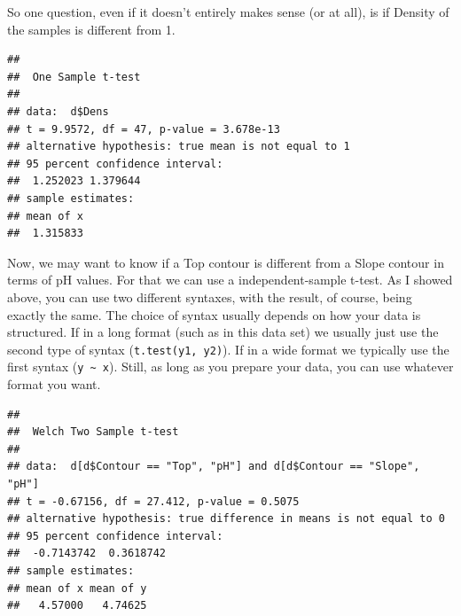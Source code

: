 \documentclass[
]{book}
\newenvironment{Shaded}{\begin{snugshade}}{\end{snugshade}}
\newcommand{\AttributeTok}[1]{\textcolor[rgb]{0.77,0.63,0.00}{#1}}
\newcommand{\CommentTok}[1]{\textcolor[rgb]{0.56,0.35,0.01}{\textit{#1}}}
\newcommand{\DecValTok}[1]{\textcolor[rgb]{0.00,0.00,0.81}{#1}}
\newcommand{\FunctionTok}[1]{\textcolor[rgb]{0.00,0.00,0.00}{#1}}
\newcommand{\NormalTok}[1]{#1}
\newcommand{\OtherTok}[1]{\textcolor[rgb]{0.56,0.35,0.01}{#1}}
\newcommand{\SpecialCharTok}[1]{\textcolor[rgb]{0.00,0.00,0.00}{#1}}
\newcommand{\StringTok}[1]{\textcolor[rgb]{0.31,0.60,0.02}{#1}}
\begin{document}
So one question, even if it doesn't entirely makes sense (or at all), is if Density of the samples
is different from 1.

\begin{Shaded}
\end{Shaded}

\begin{verbatim}
## 
##  One Sample t-test
## 
## data:  d$Dens
## t = 9.9572, df = 47, p-value = 3.678e-13
## alternative hypothesis: true mean is not equal to 1
## 95 percent confidence interval:
##  1.252023 1.379644
## sample estimates:
## mean of x 
##  1.315833
\end{verbatim}

Now, we may want to know if a Top contour is different from a Slope contour in terms of pH values.
For that we can use a independent-sample t-test. As I showed above, you can use two different syntaxes, with the result, of course, being exactly the same. The choice of syntax usually depends on how your data is structured. If in a long format (such as in this data set) we usually just use the second type of syntax (\texttt{t.test(y1,\ y2)}). If in a wide format we typically use the first syntax (\texttt{y\ \textasciitilde{}\ x}). Still, as long as you prepare your data, you can use whatever format you want.

\begin{Shaded}
\end{Shaded}

\begin{verbatim}
## 
##  Welch Two Sample t-test
## 
## data:  d[d$Contour == "Top", "pH"] and d[d$Contour == "Slope", "pH"]
## t = -0.67156, df = 27.412, p-value = 0.5075
## alternative hypothesis: true difference in means is not equal to 0
## 95 percent confidence interval:
##  -0.7143742  0.3618742
## sample estimates:
## mean of x mean of y 
##   4.57000   4.74625
\end{verbatim}
\end{document}
